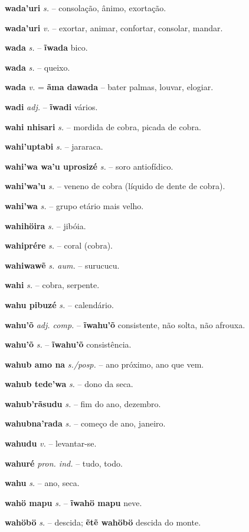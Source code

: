\textbf{wada'uri} \textit{s.} -- consolação, ânimo, exortação.

\textbf{wada'uri} \textit{v.} -- exortar, animar, confortar, consolar, mandar.

\textbf{wada} \textit{s.} -- \textbf{ĩwada} bico.

\textbf{wada} \textit{s.} -- queixo.

\textbf{wada} \textit{v.} = \textbf{ãma dawada} -- bater palmas, louvar, elogiar.

\textbf{wadi} \textit{adj.} -- \textbf{ĩwadi} vários.

\textbf{wahi nhisari} \textit{s.} -- mordida de cobra, picada de cobra.

\textbf{wahi'uptabi} \textit{s.} -- jararaca.

\textbf{wahi'wa wa'u uprosizé} \textit{s.} -- soro antiofídico.

\textbf{wahi'wa'u} \textit{s.} -- veneno de cobra (líquido de dente de cobra).

\textbf{wahi'wa} \textit{s.} -- grupo etário mais velho.

\textbf{wahihöira} \textit{s.} -- jibóia.

\textbf{wahiprére} \textit{s.} -- coral (cobra).

\textbf{wahiwawẽ} \textit{s. aum.} -- surucucu.

\textbf{wahi} \textit{s.} -- cobra, serpente.

\textbf{wahu pibuzé} \textit{s.} -- calendário.

\textbf{wahu'õ} \textit{adj. comp.} -- \textbf{ĩwahu'õ} consistente, não solta, não afrouxa.

\textbf{wahu'õ} \textit{s.} -- \textbf{ĩwahu'õ} consistência.

\textbf{wahub amo na} \textit{s./posp.} -- ano próximo, ano que vem.

\textbf{wahub tede'wa} \textit{s.} -- dono da seca.

\textbf{wahub'rãsudu} \textit{s.} -- fim do ano, dezembro.

\textbf{wahubna'rada} \textit{s.} -- começo de ano, janeiro.

\textbf{wahudu} \textit{v.} -- levantar-se.

\textbf{wahuré} \textit{pron. ind.} -- tudo, todo.

\textbf{wahu} \textit{s.} -- ano, seca.

\textbf{wahö mapu} \textit{s.} -- \textbf{ĩwahö mapu} neve.

\textbf{wahöbö} \textit{s.} -- descida; \textbf{ẽtẽ wahöbö} descida do monte.

